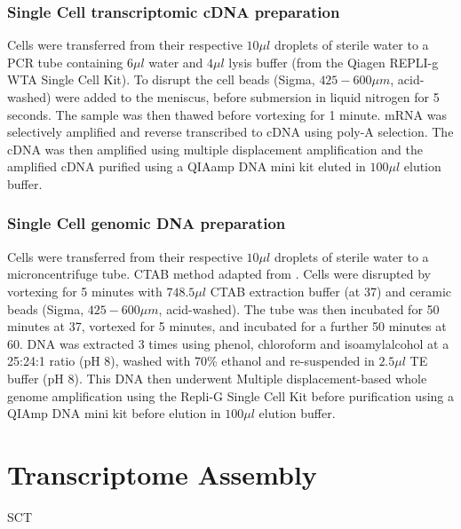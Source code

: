 \subsubsection{Single Cell transcriptomic cDNA preparation}
Cells were transferred from their respective \(10\mu l\) droplets of sterile water to
a PCR tube containing \(6\mu l\) water and \(4\mu l \) lysis buffer (from the Qiagen
REPLI-g WTA Single Cell Kit). To disrupt the cell beads (Sigma, \(425-600\mu m\), acid-washed)
were added to the meniscus, before submersion in liquid nitrogen for 5 seconds.  The sample was 
then thawed before vortexing for 1 minute.  
mRNA was selectively amplified and reverse transcribed to cDNA using poly-A selection.  The cDNA
was then amplified using multiple displacement amplification and the amplified cDNA purified
using a QIAamp DNA mini kit eluted in \(100\mu l\) elution buffer.

\subsubsection{Single Cell genomic DNA preparation}
Cells were transferred from their respective \(10\mu l\) droplets of sterile water to a microncentrifuge tube.
CTAB method adapted from \citep{Winnepenninckx1993}.  Cells were disrupted by vortexing for 5 minutes with
\(748.5\mu l\) CTAB extraction buffer (at 37\celsius) and ceramic beads (Sigma, \(425-600\mu m\), acid-washed).
The tube was then incubated for 50 minutes at 37\celsius, vortexed for 5 minutes, and incubated for a further 50
minutes at 60\celsius. DNA was extracted 3 times using phenol, chloroform and isoamylalcohol at a 25:24:1 ratio (pH 8),
washed with 70\% ethanol and re-suspended in \(2.5\mu l\) TE buffer (pH 8). This DNA then underwent 
Multiple displacement-based whole genome amplification using the Repli-G Single Cell Kit before purification using a 
QIAmp DNA mini kit before elution in \(100\mu l\) elution buffer.






\section{Transcriptome Assembly}


SCT
